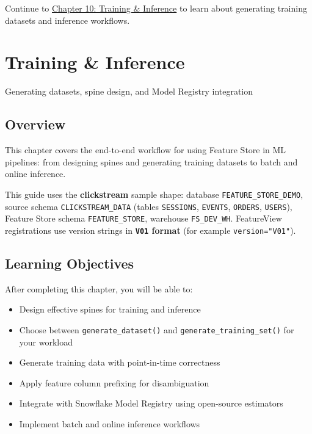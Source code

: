 \documentclass[
  letterpaper,
  DIV=11,
  numbers=noendperiod]{scrreprt}
\providecommand{\tightlist}{%
  \setlength{\itemsep}{0pt}\setlength{\parskip}{0pt}}\usepackage{longtable,booktabs,array}
\begin{document}
Continue to \protect\hyperlink{training-inference}{Chapter 10: Training
\& Inference} to learn about generating training datasets and inference
workflows.

\hypertarget{training-inference}{%
\chapter{Training \& Inference}\label{training-inference}}

Generating datasets, spine design, and Model Registry integration

\hfill\break

\hypertarget{overview-10}{%
\section{Overview}\label{overview-10}}

This chapter covers the end-to-end workflow for using Feature Store in
ML pipelines: from designing spines and generating training datasets to
batch and online inference.

This guide uses the \textbf{clickstream} sample shape: database
\texttt{FEATURE\_STORE\_DEMO}, source schema \texttt{CLICKSTREAM\_DATA}
(tables \texttt{SESSIONS}, \texttt{EVENTS}, \texttt{ORDERS},
\texttt{USERS}), Feature Store schema \texttt{FEATURE\_STORE}, warehouse
\texttt{FS\_DEV\_WH}. FeatureView registrations use version strings in
\textbf{\texttt{V01} format} (for example \texttt{version="V01"}).

\hypertarget{learning-objectives-9}{%
\section{Learning Objectives}\label{learning-objectives-9}}

After completing this chapter, you will be able to:

\begin{itemize}
\tightlist
\item
  Design effective spines for training and inference
\item
  Choose between \texttt{generate\_dataset()} and
  \texttt{generate\_training\_set()} for your workload
\item
  Generate training data with point-in-time correctness
\item
  Apply feature column prefixing for disambiguation
\item
  Integrate with Snowflake Model Registry using open-source estimators
\item
  Implement batch and online inference workflows
\end{itemize}
\end{document}
